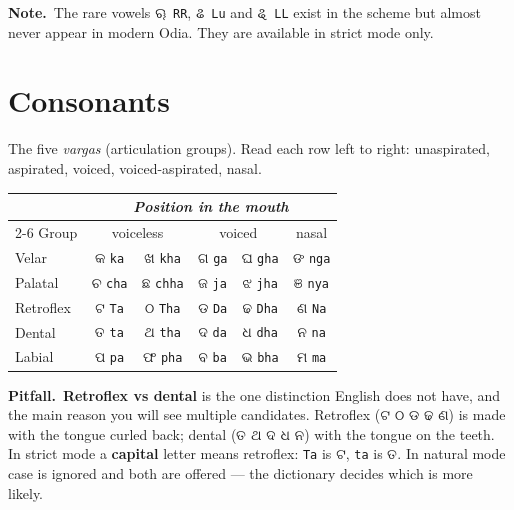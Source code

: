 \documentclass[11pt, a4paper]{article}
\newcommand{\od}[1]{{\odiafont #1}}          %
\newcommand{\odb}[1]{{\odiafont\large #1}}   %
\newcommand{\kpit}{{\color{midseaorange!85!black}\textbf{\textsf{Pitfall.}}}\ }
\newcommand{\knote}{{\color{headerblue}\textbf{\textsf{Note.}}}\ }
\begin{document}
\begin{notebox}
\knote The rare vowels \od{ୠ}~\texttt{RR}, \od{ଌ}~\texttt{Lu} and \od{ୡ}~\texttt{LL}
exist in the scheme but almost never appear in modern Odia. They are available in strict
mode only.
\end{notebox}

\section{Consonants}

The five \emph{vargas} (articulation groups). Read each row left to right: unaspirated,
aspirated, voiced, voiced-aspirated, nasal.

\begin{center}
\begin{tabular}{l c c c c c}
\toprule
& \multicolumn{5}{c}{\textit{Position in the mouth}} \\
\cmidrule(l){2-6}
Group & \multicolumn{2}{c}{voiceless} & \multicolumn{2}{c}{voiced} & nasal \\
\midrule
Velar     & \odb{କ} \texttt{ka} & \odb{ଖ} \texttt{kha} & \odb{ଗ} \texttt{ga} & \odb{ଘ} \texttt{gha} & \odb{ଙ} \texttt{nga} \\
Palatal   & \odb{ଚ} \texttt{cha} & \odb{ଛ} \texttt{chha} & \odb{ଜ} \texttt{ja} & \odb{ଝ} \texttt{jha} & \odb{ଞ} \texttt{nya} \\
Retroflex & \odb{ଟ} \texttt{Ta} & \odb{ଠ} \texttt{Tha} & \odb{ଡ} \texttt{Da} & \odb{ଢ} \texttt{Dha} & \odb{ଣ} \texttt{Na} \\
Dental    & \odb{ତ} \texttt{ta} & \odb{ଥ} \texttt{tha} & \odb{ଦ} \texttt{da} & \odb{ଧ} \texttt{dha} & \odb{ନ} \texttt{na} \\
Labial    & \odb{ପ} \texttt{pa} & \odb{ଫ} \texttt{pha} & \odb{ବ} \texttt{ba} & \odb{ଭ} \texttt{bha} & \odb{ମ} \texttt{ma} \\
\bottomrule
\end{tabular}
\end{center}

\begin{warnbox}
\kpit \textbf{Retroflex vs dental} is the one distinction English does not have, and the
main reason you will see multiple candidates. Retroflex (\od{ଟ ଠ ଡ ଢ ଣ}) is made with the
tongue curled back; dental (\od{ତ ଥ ଦ ଧ ନ}) with the tongue on the teeth. In strict mode a
\textbf{capital} letter means retroflex: \texttt{Ta} is \od{ଟ}, \texttt{ta} is \od{ତ}. In
natural mode case is ignored and both are offered --- the dictionary decides which is
more likely.
\end{warnbox}
\end{document}
